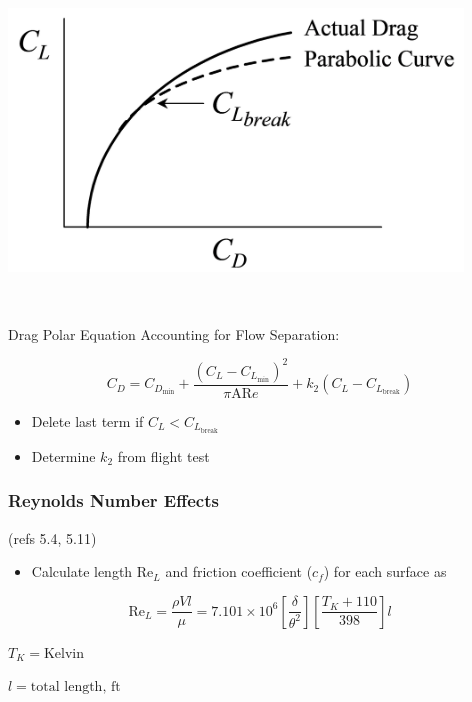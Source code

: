 \documentclass[
]{book}
\providecommand{\tightlist}{%
  \setlength{\itemsep}{0pt}\setlength{\parskip}{0pt}}
\begin{document}
\includegraphics[width=4.75in,height=3.46in]{media/05/image76.svg}

Drag Polar Equation Accounting for Flow Separation:

\[C_D = C_{D_{\mathrm{min}}} + \frac{\left(C_L - C_{L_{\mathrm{min}}}\right)^2}{\pi \mathrm{AR} e} +k_2\left(C_L - C_{L_{\mathrm{break}}}\right)\]

\begin{itemize}
\tightlist
\item
  Delete last term if \(C_L < C_{L_{\mathrm{break}}}\)
\item
  Determine \(k_2\) from flight test
\end{itemize}

\hypertarget{reynolds-number-effects-1}{%
\subsubsection*{Reynolds Number Effects}\label{reynolds-number-effects-1}}

(refs 5.4, 5.11)

\begin{itemize}
\tightlist
\item
  Calculate length \(\mathrm{Re}_L\) and friction coefficient (\(c_f\)) for each surface as
\end{itemize}

\[\mathrm{Re}_L = \frac{\rho Vl}{\mu} = 7.101 \times10^6 \left[\frac{\delta}{\theta^2} \right]\left[\frac{T_K + 110}{398}\right] l \]

\(T_K = \text{Kelvin}\)

\(l = \text{total length, ft}\)
\end{document}
